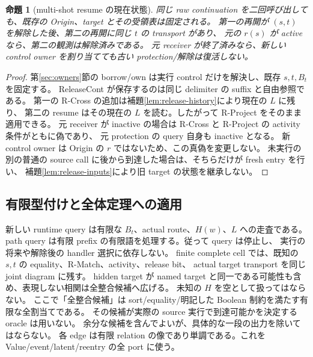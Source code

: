 \documentclass[11pt,a4paper]{article}
\newtheorem{proposition}[definition]{命題}
\begin{document}
\begin{proposition}[multi-shot resume の現在状態]
\label{prop:release-resume}
同じ raw continuation を二回呼び出しても、既存の Origin、target とその受領表は固定される。
第一の再開が \((s,t)\) を解除した後、第二の再開に同じ \(t\) の transport があり、
元の \(r(s)\) が active なら、第二の観測は解除済みである。
元 receiver が終了済みなら、新しい control owner を割り当てても古い protection/解除は復活しない。
\end{proposition}
\begin{proof}
第\ref{sec:owners}節の borrow/own は実行 control だけを解決し、既存 \(s,t,B_t\) を固定する。
ReleaseCont が保存するのは同じ delimiter の suffix と自由参照である。
第一の R-Cross の追加は補題\ref{lem:release-history}により現在の \(L\) に残り、
第二の resume はその現在の \(L\) を読む。したがって R-Project をそのまま適用できる。
元 receiver が inactive の場合は R-Cross と R-Project の activity 条件がともに偽であり、
元 protection の query 自身も inactive となる。
新 control owner は Origin の \(r\) ではないため、この真偽を変更しない。
未実行の別の普通の source call に後から到達した場合は、そちらだけが fresh entry を行い、
補題\ref{lem:release-inputs}により旧 target の状態を継承しない。
\end{proof}

\subsection{有限型付けと全体定理への適用}

新しい runtime query は有限な \(B_t\)、actual route、\(H(w)\)、\(L\) への走査である。
path query は有限 prefix の有限語を処理する。従って query は停止し、
実行の将来や解除後の handler 選択に依存しない。
finite complete cell では、既知の \(s,t\) の equality、R-Match、activity、release bit、
actual target transport を同じ joint diagram に残す。
hidden target が named target と同一である可能性も含め、表現しない相関は全整合候補へ広げる。
未知の \(H\) を空として扱ってはならない。
ここで「全整合候補」は sort/equality/明記した Boolean 制約を満たす有限な全割当てである。
その候補が実際の source 実行で到達可能かを決定する oracle は用いない。
余分な候補を含んでよいが、具体的な一段の出力を除いてはならない。
各 edge は有限 relation の像であり単調である。これを Value/event/latent/reentry の全 port に使う。
\end{document}
